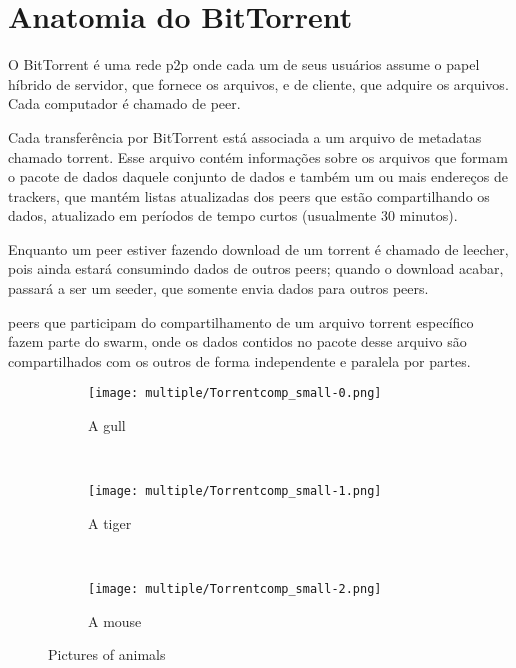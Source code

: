 
\chapter{Anatomia do BitTorrent}

O BitTorrent é uma rede \gls{p2p} onde cada um de seus usuários assume o papel híbrido
de servidor, que fornece os arquivos, e de cliente, que adquire os arquivos. Cada
computador é chamado de \gls{peer}.

Cada transferência por BitTorrent está associada a um arquivo de \glspl{metadata}
chamado \gls{torrent}. Esse arquivo contém informações sobre os arquivos que formam o
pacote de dados daquele conjunto de dados e também um ou mais endereços de
\glspl*{tracker}, que mantém listas atualizadas dos \glspl*{peer} que estão
compartilhando os dados, atualizado em períodos de tempo curtos (usualmente 30 minutos).

Enquanto um \gls*{peer} estiver fazendo download de um \gls*{torrent} é chamado de
\gls{leecher}, pois ainda estará consumindo dados de outros \glspl*{peer}; quando o
download acabar, passará a ser um \gls{seeder}, que somente envia dados para outros
\glspl*{peer}.

\Glspl*{peer} que participam do compartilhamento de um arquivo \gls*{torrent} específico
fazem parte do \gls{swarm}, onde os dados contidos no pacote desse arquivo são
compartilhados com os outros de forma independente e paralela por partes.

\begin{figure}
    \centering
    \begin{subfigure}[b]{0.3\textwidth}
            \texttt{[image: multiple/Torrentcomp\_small-0.png]}
            \caption{A gull}
            \label{fig:gull}
    \end{subfigure}%
    ~ %
    \begin{subfigure}[b]{0.3\textwidth}
            \texttt{[image: multiple/Torrentcomp\_small-1.png]}
            \caption{A tiger}
            \label{fig:tiger}
    \end{subfigure}
    ~ %
    \begin{subfigure}[b]{0.3\textwidth}
            \texttt{[image: multiple/Torrentcomp\_small-2.png]}
            \caption{A mouse}
            \label{fig:mouse}
    \end{subfigure}
    \caption{Pictures of animals}\label{fig:animals}
\end{figure}


